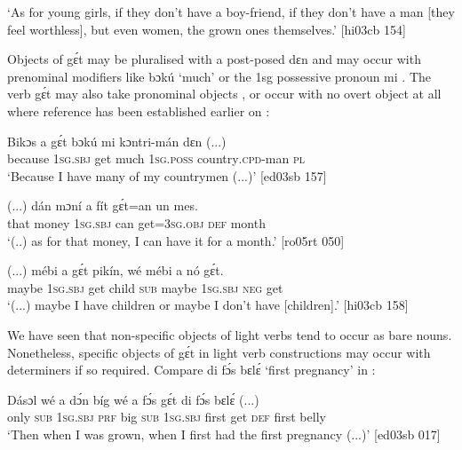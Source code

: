 \glt ‘As for young girls, if they don’t have a boy-friend, if they don’t have a man
[they feel worthless], but even women, the grown ones themselves.’ [hi03cb 154]
\z

Objects of gɛ́t may be pluralised with a post-posed dɛn  and may occur with prenominal modifiers like bɔkú ‘much’ or the 1sg possessive pronoun mi . The verb gɛ́t may also take pronominal objects , or occur with no overt object at all where reference has been established earlier on :


\ea%
    \label{ex:key:1160}
    \gll Bikɔs  a    gɛ́t  bɔkú  mi    kɔntri-mán    dɛn  (...)\\
because  \textsc{1sg.sbj}  get  much  \textsc{1sg.poss}  country\textsc{.cpd}{}-man  \textsc{pl}\\

\glt ‘Because I have many of my countrymen (...)’ [ed03sb 157]
\z


\ea%
    \label{ex:key:1161}
    \gll (...)  dán  mɔní  a    fít  gɛ́t=an    un  mes.\\
  {} that  money  \textsc{1sg.sbj}  can  get=\textsc{3sg.obj}  \textsc{def}  month\\

\glt ‘(..) as for that money, I can have it for a month.’ [ro05rt 050]
\z


\ea%
    \label{ex:key:1162}
    \gll (...)  mébi  a    gɛ́t  pikín,  wé  mébi  a    nó  gɛ́t.\\
  {} maybe  \textsc{1sg.sbj}  get  child  \textsc{sub}  maybe  \textsc{1sg.sbj}  \textsc{neg}  get\\

\glt ‘(...) maybe I have children or maybe I don’t have [children].’ [hi03cb 158]
\z

We have seen that non-specific objects of light verbs tend to occur as bare nouns. Nonetheless, specific objects of gɛ́t in light verb constructions may occur with determiners if so required. Compare di fɔ́s bɛlɛ́ ‘first pregnancy’ in :


\ea%
    \label{ex:key:1163}
    \gll Dásɔl  wé  a    dɔ́n  bíg  wé  a    fɔ́s  gɛ́t
di  fɔ́s  bɛlɛ́  (...)\\
only    \textsc{sub}  \textsc{1sg.sbj}  \textsc{prf}  big  \textsc{sub}  \textsc{1sg.sbj}  first  get
\textsc{def}  first  belly\\

\glt ‘Then when I was grown, when I first had the first pregnancy (...)’ [ed03sb 017]
\z

